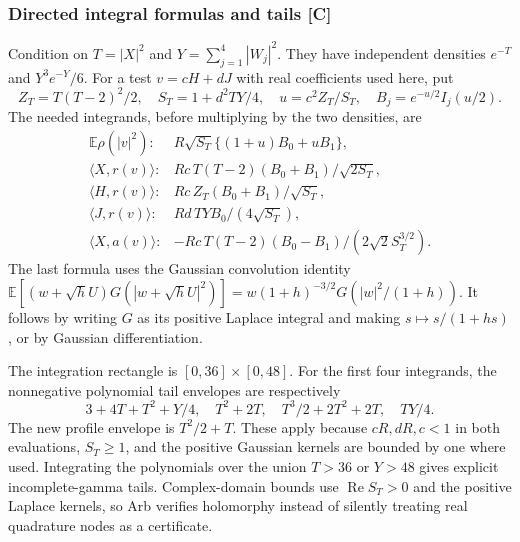 \subsubsection{Directed integral formulas and tails [C]}
Condition on $T=|X|^2$ and $Y=\sum_{j=1}^4|W_j|^2$.
They have independent densities $e^{-T}$ and $Y^3e^{-Y}/6$.
For a test $v=cH+dJ$ with real coefficients used here, put
\[
 Z_T=T(T-2)^2/2,\quad S_T=1+d^2TY/4,\quad
 u=c^2Z_T/S_T,\quad B_j=e^{-u/2}I_j(u/2).
\]
The needed integrands, before multiplying by the two densities, are
\[
\begin{array}{ll}
 \mathbb E\rho(|v|^2):&R\sqrt{S_T}\{(1+u)B_0+uB_1\},\\
 \langle X,r(v)\rangle:&Rc\,T(T-2)(B_0+B_1)/\sqrt{2S_T},\\
 \langle H,r(v)\rangle:&Rc\,Z_T(B_0+B_1)/\sqrt{S_T},\\
 \langle J,r(v)\rangle:&Rd\,TYB_0/(4\sqrt{S_T}),\\
 \langle X,a(v)\rangle:&-Rc\,T(T-2)(B_0-B_1)/(2\sqrt2 S_T^{3/2}).
\end{array}
\]
The last formula uses the Gaussian convolution identity
$\mathbb E[(w+\sqrt h U)G(|w+\sqrt h U|^2)]
=w(1+h)^{-3/2}G(|w|^2/(1+h))$.
It follows by writing $G$ as its positive Laplace integral and making
$s\mapsto s/(1+hs)$, or by Gaussian differentiation.

The integration rectangle is $[0,36]\times[0,48]$.
For the first four integrands, the nonnegative polynomial tail envelopes
are respectively
\[
 3+4T+T^2+Y/4,\quad T^2+2T,\quad
 T^3/2+2T^2+2T,\quad TY/4.
\]
The new profile envelope is $T^2/2+T$.
These apply because $cR,dR,c<1$ in both evaluations, $S_T\ge1$,
and the positive Gaussian kernels are bounded by one where used.
Integrating the polynomials over the union $T>36$ or $Y>48$ gives explicit
incomplete-gamma tails. Complex-domain bounds use $\operatorname{Re}S_T>0$
and the positive Laplace kernels, so Arb verifies holomorphy instead of
silently treating real quadrature nodes as a certificate.

